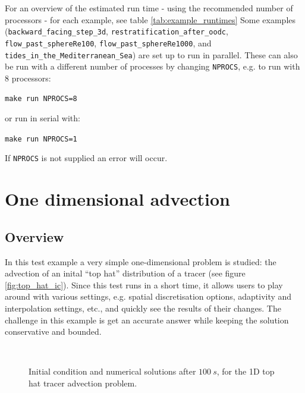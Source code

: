 For an overview of the estimated run time - using the recommended number of processors - for each
example, see table \ref{tab:example_runtimes}
Some examples (\texttt{backward\_facing\_step\_3d}, \texttt{restratification\_after\_oodc},
\texttt{flow\_past\_sphereRe100}, \texttt{flow\_past\_sphereRe1000},
and \texttt{tides\_in\_the\_Mediterranean\_Sea})
are set up to run in parallel. These can also be run with a different number
of processes by changing \texttt{NPROCS}, e.g. to run with 8 processors:

\hspace{0.05\textwidth}\texttt{make run NPROCS=8}

or run in serial with:

\hspace{0.05\textwidth}\texttt{make run NPROCS=1}

If \texttt{NPROCS} is not supplied an error will occur.


\section{One dimensional advection}
\label{sec:oned_advection}
\subsection{Overview}
In this test example a very simple one-dimensional problem is
studied: the advection of an inital ``top hat'' distribution
of a tracer (see figure \ref{fig:top_hat_ic}). Since this test runs in a
short time, it allows users to play around with various
settings, e.g. spatial discretisation options, adaptivity
and interpolation settings, etc., and quickly see the results
of their changes. The challenge in this example is get an accurate
answer while keeping the solution conservative and bounded.

\begin{figure}
  \centering
    \label{fig:top_hat_ic}
    \label{fig:top_hat_cg_example} \\
    \label{fig:top_hat_dg}
    \label{fig:top_hat_cv}
  \caption{Initial condition and numerical solutions after $100~s$, for the 1D top hat tracer advection problem.}
\end{figure}


